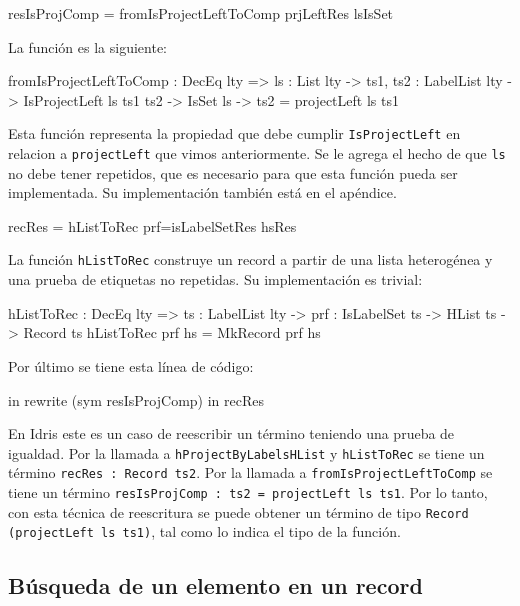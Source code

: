 \begin{code}
resIsProjComp = fromIsProjectLeftToComp prjLeftRes lsIsSet
\end{code}

La función es la siguiente:

\begin{code}
fromIsProjectLeftToComp : DecEq lty => {ls : List lty} -> 
  {ts1, ts2 : LabelList lty} -> IsProjectLeft ls ts1 ts2 -> 
  IsSet ls -> ts2 = projectLeft ls ts1
\end{code}

Esta función representa la propiedad que debe cumplir \texttt{IsProjectLeft} en relacion a \texttt{projectLeft} que vimos anteriormente. Se le agrega el hecho de que \texttt{ls} no debe tener repetidos, que es necesario para que esta función pueda ser implementada. Su implementación también está en el apéndice.

\begin{code}
recRes = hListToRec {prf=isLabelSetRes} hsRes
\end{code}

La función \texttt{hListToRec} construye un record a partir de una lista heterogénea y una prueba de etiquetas no repetidas. Su implementación es trivial:

\begin{code}
hListToRec : DecEq lty => {ts : LabelList lty} -> 
  {prf : IsLabelSet ts} -> HList ts -> Record ts
hListToRec {prf} hs = MkRecord prf hs
\end{code}

Por último se tiene esta línea de código:

\begin{code}
in rewrite (sym resIsProjComp) in recRes
\end{code}

En Idris este es un caso de reescribir un término teniendo una prueba de igualdad. Por la llamada a \texttt{hProjectByLabelsHList} y \texttt{hListToRec} se tiene un término \texttt{recRes : Record ts2}. Por la llamada a \texttt{fromIsProjectLeftToComp} se tiene un término \texttt{resIsProjComp : ts2 = projectLeft ls ts1}. Por lo tanto, con esta técnica de reescritura se puede obtener un término de tipo \texttt{Record (projectLeft ls ts1)}, tal como lo indica el tipo de la función.

\subsection{Búsqueda de un elemento en un record}

